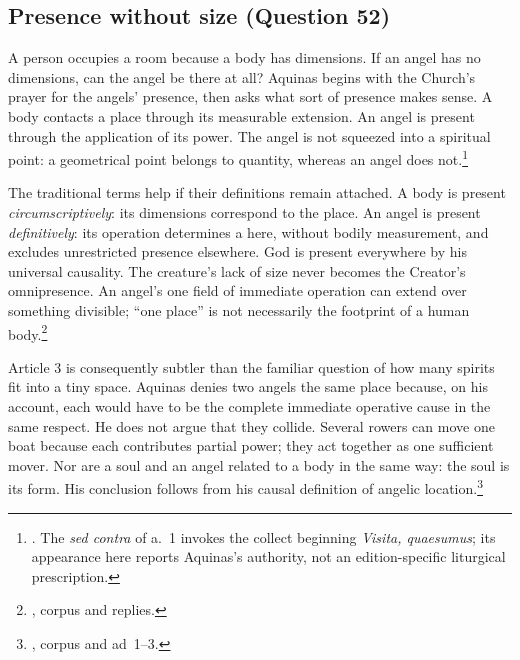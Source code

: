 \subsection{Presence without size (Question 52)}

A person occupies a room because a body has dimensions. If an angel has no dimensions, can the angel be there at all? Aquinas begins with the Church's prayer for the angels' presence, then asks what sort of presence makes sense. A body contacts a place through its measurable extension. An angel is present through the application of its power. The angel is not squeezed into a spiritual point: a geometrical point belongs to quantity, whereas an angel does not.\footnote{. The \emph{sed contra} of a.~1 invokes the collect beginning \emph{Visita, quaesumus}; its appearance here reports Aquinas's authority, not an edition-specific liturgical prescription.}

The traditional terms help if their definitions remain attached. A body is present \emph{circumscriptively}: its dimensions correspond to the place. An angel is present \emph{definitively}: its operation determines a here, without bodily measurement, and excludes unrestricted presence elsewhere. God is present everywhere by his universal causality. The creature's lack of size never becomes the Creator's omnipresence. An angel's one field of immediate operation can extend over something divisible; ``one place'' is not necessarily the footprint of a human body.\footnote{, corpus and replies.}

Article 3 is consequently subtler than the familiar question of how many spirits fit into a tiny space. Aquinas denies two angels the same place because, on his account, each would have to be the complete immediate operative cause in the same respect. He does not argue that they collide. Several rowers can move one boat because each contributes partial power; they act together as one sufficient mover. Nor are a soul and an angel related to a body in the same way: the soul is its form. His conclusion follows from his causal definition of angelic location.\footnote{, corpus and ad~1--3.}


